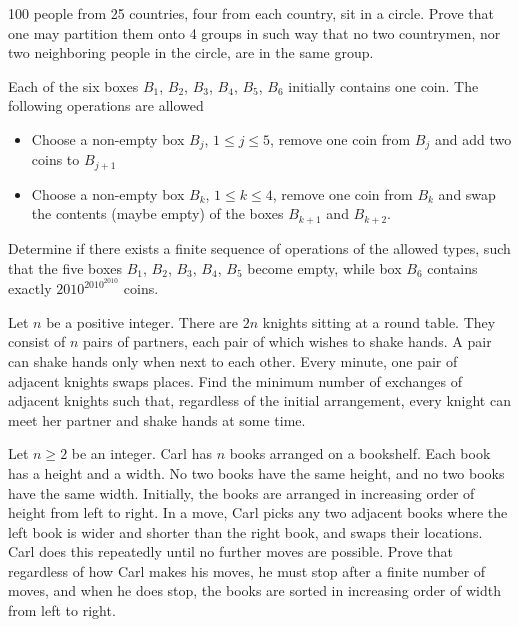 \begin{problem} 
    100 people from 25 countries, four from each country, sit in a circle. Prove that one may partition them onto 4 groups in such way that no two countrymen, nor two neighboring people in the circle, are in the same group. 
\end{problem}

\begin{problem} [IMO 2010]
    Each of the six boxes $B_1$, $B_2$, $B_3$, $B_4$, $B_5$, $B_6$ initially contains one coin. The following operations are allowed
    \begin{itemize}
        \item Choose a non-empty box $B_j$, $1\leq j \leq 5$, remove one coin from $B_j$ and add two coins to $B_{j+1}$
        \item Choose a non-empty box $B_k$, $1\leq k \leq 4$, remove one coin from $B_k$ and swap the contents (maybe empty) of the boxes $B_{k+1}$ and $B_{k+2}$.
    \end{itemize}
    Determine if there exists a finite sequence of operations of the allowed types, such that the five boxes $B_1$, $B_2$, $B_3$, $B_4$, $B_5$ become empty, while box $B_6$ contains exactly $2010^{2010^{2010}}$ coins.
\end{problem}

\begin{problem} [ISL 2024 C3]
    Let $n$ be a positive integer. There are $2n$ knights sitting at a round table. They consist of $n$ pairs of partners, each pair of which wishes to shake hands. A pair can shake hands only when next to each other. Every minute, one pair of adjacent knights swaps places. Find the minimum number of exchanges of adjacent knights such that, regardless of the initial arrangement, every knight can meet her partner and shake hands at some time.
\end{problem}

\begin{problem} [USAJMO 2020]
    Let $n \geq 2$ be an integer. Carl has $n$ books arranged on a bookshelf. Each book has a height and a width. No two books have the same height, and no two books have the same width. Initially, the books are arranged in increasing order of height from left to right. In a move, Carl picks any two adjacent books where the left book is wider and shorter than the right book, and swaps their locations. Carl does this repeatedly until no further moves are possible. Prove that regardless of how Carl makes his moves, he must stop after a finite number of moves, and when he does stop, the books are sorted in increasing order of width from left to right.
\end{problem}

